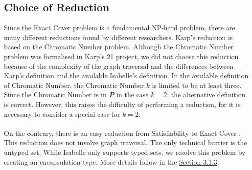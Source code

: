 \subsection{Choice of Reduction}
Since the Exact Cover problem is a fundamental NP-hard problem, there are many different reductions found by different researchers. 
Karp's reduction\cite{karp2010reducibility} is based on the  Chromatic Number problem. 
Although the Chromatic Number problem was formalised in Karp's 21 project, we did not choose this reduction
because of the complexity of the graph traversal and the differences between Karp's definition and the available Isabelle's definition. 
In the available definition of Chromatic Number, the Chromatic Number $k$ is limited to be at least three. Since 
the Chromatic Number is in \textbf{\textit{P}} in the case $k = 2$, the alternative definition is correct. However, this raises the difficulty of performing 
a reduction, for it is necessary to consider a special case for $k = 2$.\\\\ 
On the contrary, there is an easy reduction from Satisfiability to Exact Cover \cite{118058}. This reduction does not involve graph traversal.
The only technical barrier is the untyped set. While Isabelle only supports typed sets, we resolve this problem
by creating an encapsulation type. More details follow in the \hyperref[sec:sat-imp]{Section 3.1.3}. 

